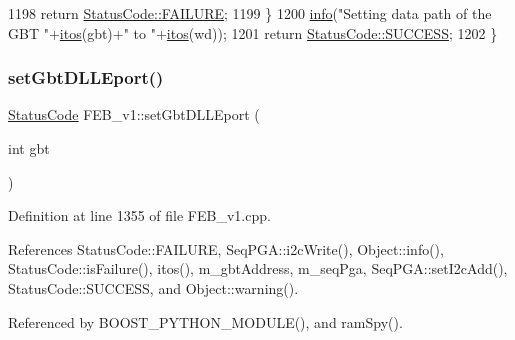 \begin{DoxyCode}
1198     \textcolor{keywordflow}{return} \hyperlink{classStatusCode_a6f565cbeadc76d14c72f047e5e85eb4ba3da73d4c469762eb9d3c960368252b26}{StatusCode::FAILURE};
1199   \}
1200   \hyperlink{classObject_a644fd329ea4cb85f54fa6846484b84a8}{info}(\textcolor{stringliteral}{"Setting data path of the GBT "}+\hyperlink{Tools_8h_af330027dbdafb9a30768b3613c553e60}{itos}(gbt)+\textcolor{stringliteral}{" to "}+\hyperlink{Tools_8h_af330027dbdafb9a30768b3613c553e60}{itos}(wd));
1201   \textcolor{keywordflow}{return} \hyperlink{classStatusCode_a6f565cbeadc76d14c72f047e5e85eb4badd0da38d3ba0d922efd1f4619bc37ad8}{StatusCode::SUCCESS};
1202 \}
\end{DoxyCode}
\mbox{\label{classFEB__v1_a66584fe850cdf9e4ccd03fd4b2f4db38}} 
\subsubsection{\texorpdfstring{set\+Gbt\+D\+L\+L\+Eport()}{setGbtDLLEport()}}
{\footnotesize\ttfamily \hyperlink{classStatusCode}{Status\+Code} F\+E\+B\+\_\+v1\+::set\+Gbt\+D\+L\+L\+Eport (\begin{DoxyParamCaption}\item[{int}]{gbt }\end{DoxyParamCaption})}



Definition at line 1355 of file F\+E\+B\+\_\+v1.\+cpp.



References Status\+Code\+::\+F\+A\+I\+L\+U\+RE, Seq\+P\+G\+A\+::i2c\+Write(), Object\+::info(), Status\+Code\+::is\+Failure(), itos(), m\+\_\+gbt\+Address, m\+\_\+seq\+Pga, Seq\+P\+G\+A\+::set\+I2c\+Add(), Status\+Code\+::\+S\+U\+C\+C\+E\+SS, and Object\+::warning().



Referenced by B\+O\+O\+S\+T\+\_\+\+P\+Y\+T\+H\+O\+N\+\_\+\+M\+O\+D\+U\+L\+E(), and ram\+Spy().


